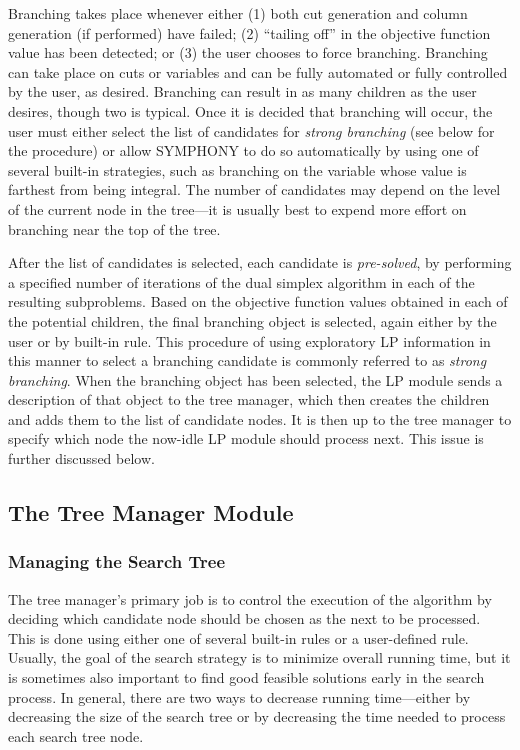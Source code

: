 Branching takes place whenever either (1) both cut generation and
column generation (if performed) have failed; (2) ``tailing off'' in
the objective function value has been detected; or (3) the
user chooses to force branching. Branching can take place on cuts or
variables and can be fully automated or fully controlled by the user,
as desired. Branching can result in as many children as the user
desires, though two is typical. Once it is decided that branching will
occur, the user must either select the list of candidates for {\em
strong branching} (see below for the procedure) or allow SYMPHONY to
do so automatically by using one of several built-in strategies, such
as branching on the variable whose value is farthest from being
integral. The number of candidates may depend on the level of the
current node in the tree---it is usually best to expend more effort on
branching near the top of the tree.

After the list of candidates is selected, each candidate is {\em
pre-solved}, by performing a specified number of iterations of the
dual simplex algorithm in each of the resulting subproblems. Based on
the objective function values obtained in each of the potential
children, the final branching object is selected, again either by the
user or by built-in rule. This procedure of using exploratory LP
information in this manner to select a branching candidate is commonly
referred to as {\em strong branching}. When the branching object has
been selected, the LP module sends a description of that object to the
tree manager, which then creates the children and adds them to the
list of candidate nodes. It is then up to the tree manager to specify
which node the now-idle LP module should process next. This issue is
further discussed below.

\subsection{The Tree Manager Module}
\label{tree-management}

\subsubsection{Managing the Search Tree}

The tree manager's primary job is to control the execution of the
algorithm by deciding which candidate node should be chosen as the
next to be processed. This is done using either one of several
built-in rules or a user-defined rule. Usually, the goal of the search
strategy is to minimize overall running time, but it is sometimes
also important to find good feasible solutions early in the search
process. In general, there are two ways to decrease running
time---either by decreasing the size of the search tree or by
decreasing the time needed to process each search tree node.

